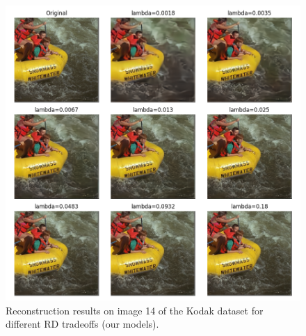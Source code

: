 \begin{figure}
    \centering
    \includegraphics[width=15cm]{../img/bdpsnr_kodak_14.png}
    \caption[Reconstruction results on image 14 of the Kodak dataset for different RD tradeoffs (our models).]{Reconstruction results on image 14 of the Kodak dataset for different RD tradeoffs (our models).}
    \label{appendix:bdpsnr_1:b}
\end{figure}

